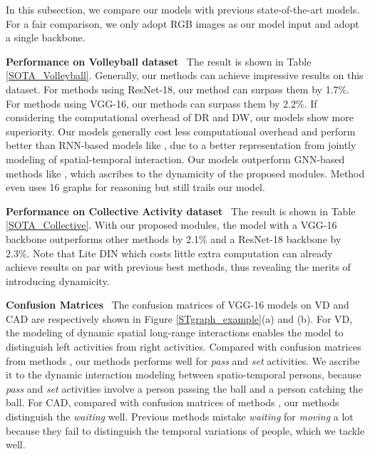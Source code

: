 \documentclass[10pt,twocolumn,letterpaper]{article}
\begin{document}
In this subsection, we compare our models with previous state-of-the-art models. For a fair comparison, we only adopt RGB images as our model input and adopt a single backbone. 


\textbf{Performance on Volleyball dataset} \ The result is shown in Table \ref{SOTA_Volleyball}. Generally, our methods can achieve impressive results on this dataset. For methods using ResNet-18, our method can surpass them by 1.7\%. For methods using VGG-16, our methods can surpass them by 2.2\%. If considering the computational overhead of DR and DW, our models show more superiority. Our models generally cost less computational overhead and perform better than RNN-based models like \cite{yan2018pctdm,qi2018stagnet,bagautdinov2017social,li2017sbgar,shu2017cern}, due to a better representation from jointly modeling of spatial-temporal interaction. Our models outperform GNN-based methods like \cite{wu2019learning,yan2020higcin,gavrilyuk2020actor}, which ascribes to the dynamicity of the proposed modules. Method \cite{wu2019learning} even uses 16 graphs for reasoning but still trails our model. 

\textbf{Performance on Collective Activity dataset} \ The result is shown in Table \ref{SOTA_Collective}. With our proposed modules, the model with a VGG-16 backbone outperforms other methods by 2.1\% and a ResNet-18 backbone by 2.3\%. Note that Lite DIN which costs little extra computation can already achieve results on par with previous best methods, thus revealing the merits of introducing dynamicity.  

\textbf{Confusion Matrices} \ The confusion matrices of VGG-16 models on VD and CAD are respectively shown in Figure \ref{STgraph_example}(a) and (b). For VD, the modeling of dynamic spatial long-range interactions enables the model to distinguish left activities from right activities. Compared with confusion matrices from methods \cite{qi2018stagnet,yan2020higcin}, our methods performs well for \textit{pass} and \textit{set} activities. We ascribe it to the dynamic interaction modeling between spatio-temporal persons, because \textit{pass} and \textit{set} activities involve a person passing the ball and a person catching the ball. For CAD, compared with confusion matrices of methods \cite{ibrahim2016hierarchical,wang2017merge_two_class,yan2020higcin}, our methods distinguish the \textit{waiting} well. Previous methods mistake \textit{waiting} for \textit{moving} a lot because they fail to distinguish the temporal variations of people, which we tackle well.
\end{document}
